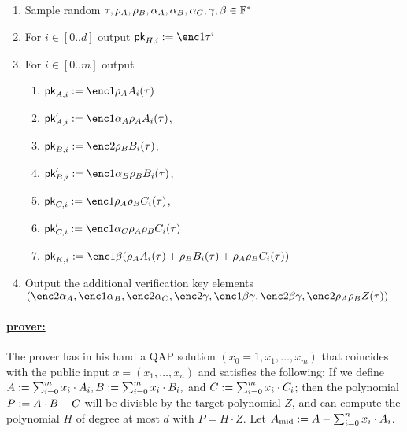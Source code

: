 \documentclass[11pt]{article}
\numberwithin{figure}{section} %
\begin{document}
\begin{enumerate}
 \item Sample random $\tau,\rho_A,\rho_B,\alpha_A,\alpha_B,\alpha_C,\gamma,\beta\in \mathbb F^*$
 \item For $i\in [0..d]$ output $\pk_{H,i}\defeq \enc1{\tau^i}$
 \item For $i\in [0..m]$ output
 
 \begin{enumerate}
  \item $\pk_{A,i}\defeq \enc1{\rho_A A_i(\tau)}$
  
\item  $\pk'_{A,i}\defeq\enc1{\alpha_A\rho_A A_i(\tau)}$,
\item $\pk_{B,i}\defeq\enc2{\rho_B B_i(\tau)}$,
\item $\pk'_{B,i}\defeq \enc1{\alpha_B\rho_B B_i(\tau)}$,
\item $\pk_{C,i}\defeq \enc1{\rho_A\rho_B C_i(\tau)}$,
\item $\pk'_{C,i}\defeq \enc1{\alpha_C \rho_A\rho_B C_i(\tau)}$ 
\item $\pk_{K,i}\defeq \enc1{\beta (\rho_A A_i(\tau) + \rho_B B_i(\tau) + \rho_A\rho_B C_i(\tau))}$ 

\end{enumerate}
\item Output the additional verification key elements $(\enc2{\alpha_A},\enc1{\alpha_B},\enc2{\alpha_C},\enc2{\gamma},\enc1{\beta\gamma},\enc2{\beta\gamma},\enc2{\rho_A\rho_B Z(\tau)})$
 \end{enumerate}

\newcommand{\Amid}{\ensuremath{A_{\mathrm{mid}}}\xspace}
\paragraph{\underline{\bctv prover:}\\}
The prover has in his hand a QAP solution $(x_0=1,x_1,\ldots,x_m)$ that coincides with the public input $x=(x_1,\ldots,x_n)$ and satisfies the following:
If we define $A:= \sum_{i=0}^m x_i\cdot A_i, B:= \sum_{i=0}^m x_i \cdot B_i,$ and $C:= \sum_{i=0}^m x_i \cdot C_i$;
then the polynomial $P:= A\cdot B - C$ will be divisble by the target polynomial $Z$, and \per can compute the polynomial $H$ of degree at most $d$ with $P=H\cdot Z$. Let $\Amid\defeq A -\sum_{i=0}^n x_i\cdot A_i$.
\end{document}
